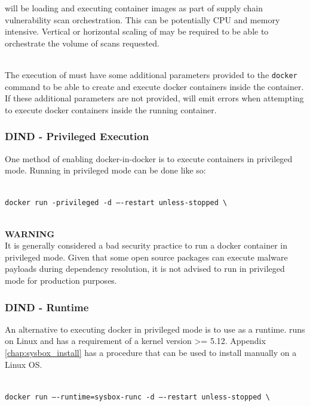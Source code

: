 \cxflowplusplus will be loading and executing container images as part of supply chain vulnerability scan
orchestration.  This can be potentially CPU and memory intensive.  Vertical or horizontal scaling
of \cxflowplusplus may be required to be able to orchestrate the volume of scans requested.

\noindent\\The execution of \cxflowplusplus must have some additional parameters provided to the
\texttt{docker} command to be able to create and execute docker containers inside the \cxflowplusplus
container.  If these additional parameters are not provided, \cxflowplusplus will emit errors when
attempting to execute docker containers inside the running container.

\subsubsection{DIND - Privileged Execution}

One method of enabling docker-in-docker is to execute containers in privileged mode.
Running \cxflowplusplus in privileged mode can be done like so:


\noindent\\\texttt{docker run -privileged -d ----restart unless-stopped \textbackslash }
\noindent\\ \tabto{5mm} \texttt{\cxflowplusplustag}

\noindent\\\textbf{WARNING}
\noindent\\It is generally considered a bad security practice to run a docker container in privileged mode.
Given that some open source packages can execute malware payloads during dependency resolution, it is not
advised to run in privileged mode for production purposes.

\subsubsection{DIND - \sysbox Runtime}

An alternative to executing docker in privileged mode is to use \sysbox as a runtime.  \sysbox runs on Linux
and has a requirement of a kernel version >= 5.12.  Appendix \ref{chap:sysbox_install} has
a procedure that can be used to install \sysbox manually on a Linux OS.

\noindent\\\texttt{docker run ----runtime=sysbox-runc -d ----restart unless-stopped \textbackslash}
\noindent\\ \tabto{5mm} \texttt{\cxflowplusplustag}


